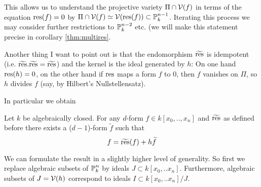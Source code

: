 This allows us to understand the projective variety $\Pi \cap \operatorname{\mathcal V}(f)$ in terms of the equation ${\operatorname{res}}(f) = 0$ by $\Pi \cap \operatorname{\mathcal V}(f) \simeq \operatorname{\mathcal V}({\operatorname{res}}(f)) \subset \operatorname{\mathbb P}^{n-1}_k$.
Iterating this process we may consider further restrictions to $\operatorname{\mathbb P}^{n-2}_k$ etc. (we will make this statement precise in corollary \ref{thm:multires}.

Another thing I want to point out is that the endomorphism $\widetilde{{\operatorname{res}}}$ is idempotent (i.e. $\widetilde{{\operatorname{res}}}.\widetilde{{\operatorname{res}}} = \widetilde{{\operatorname{res}}}$) and the kernel is the ideal generated by $h$: On one hand ${\operatorname{res}}(h) = 0$, on the other hand if ${\operatorname{res}}$ maps a form $f$ to $0$, then $f$ vanishes on $\Pi$, so $h$ divides $f$ (say, by Hilbert's Nullstellensatz).

In particular we obtain
\begin{proposition}
Let $k$ be algebraically closed.
For any $d$-form $f \in k[x_0,..,x_n]$ and $\widetilde{{\operatorname{res}}}$ as defined before there exists a ($d-1$)-form $\widetilde f$ such that
\begin{equation}
f = \widetilde{{\operatorname{res}}}(f) +  h\widetilde f
\end{equation}
\end{proposition}

\begin{todo}
\item We can formulate the result in a slightly higher level of generality. So first we replace algebraic subsets of $\operatorname{\mathbb P}^n_k$ by ideals $J \subset k[x_0,..x_n]$.
Furthermore, algebraic subsets of $J = \operatorname{\mathcal V}(h)$ correspond to ideals $I \subset k[x_0,..x_n]/J$.
\end{todo}


